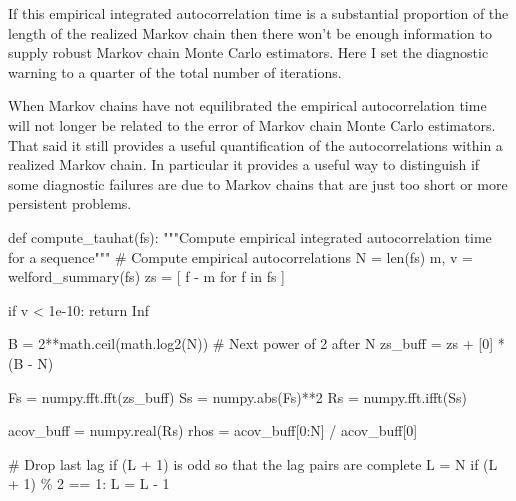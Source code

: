 \documentclass[
  letterpaper,
  DIV=11,
  numbers=noendperiod]{scrartcl}
\newenvironment{Shaded}{\begin{snugshade}}{\end{snugshade}}
\newcommand{\BuiltInTok}[1]{\textcolor[rgb]{0.00,0.23,0.31}{#1}}
\newcommand{\CommentTok}[1]{\textcolor[rgb]{0.37,0.37,0.37}{#1}}
\newcommand{\ControlFlowTok}[1]{\textcolor[rgb]{0.00,0.23,0.31}{#1}}
\newcommand{\DecValTok}[1]{\textcolor[rgb]{0.68,0.00,0.00}{#1}}
\newcommand{\FloatTok}[1]{\textcolor[rgb]{0.68,0.00,0.00}{#1}}
\newcommand{\KeywordTok}[1]{\textcolor[rgb]{0.00,0.23,0.31}{#1}}
\newcommand{\NormalTok}[1]{\textcolor[rgb]{0.00,0.23,0.31}{#1}}
\newcommand{\OperatorTok}[1]{\textcolor[rgb]{0.37,0.37,0.37}{#1}}
\begin{document}
If this empirical integrated autocorrelation time is a substantial
proportion of the length of the realized Markov chain then there won't
be enough information to supply robust Markov chain Monte Carlo
estimators. Here I set the diagnostic warning to a quarter of the total
number of iterations.

When Markov chains have not equilibrated the empirical autocorrelation
time will not longer be related to the error of Markov chain Monte Carlo
estimators. That said it still provides a useful quantification of the
autocorrelations within a realized Markov chain. In particular it
provides a useful way to distinguish if some diagnostic failures are due
to Markov chains that are just too short or more persistent problems.

\begin{Shaded}
\begin{Highlighting}[]
\KeywordTok{def}\NormalTok{ compute\_tauhat(fs):}
  \CommentTok{"""Compute empirical integrated autocorrelation time for a sequence"""}
  \CommentTok{\# Compute empirical autocorrelations}
\NormalTok{  N }\OperatorTok{=} \BuiltInTok{len}\NormalTok{(fs)}
\NormalTok{  m, v }\OperatorTok{=}\NormalTok{ welford\_summary(fs)}
\NormalTok{  zs }\OperatorTok{=}\NormalTok{ [ f }\OperatorTok{{-}}\NormalTok{ m }\ControlFlowTok{for}\NormalTok{ f }\KeywordTok{in}\NormalTok{ fs ]}
  
  \ControlFlowTok{if}\NormalTok{ v }\OperatorTok{\textless{}} \FloatTok{1e{-}10}\NormalTok{:}
    \ControlFlowTok{return}\NormalTok{ Inf}
  
\NormalTok{  B }\OperatorTok{=} \DecValTok{2}\OperatorTok{**}\NormalTok{math.ceil(math.log2(N)) }\CommentTok{\# Next power of 2 after N}
\NormalTok{  zs\_buff }\OperatorTok{=}\NormalTok{ zs }\OperatorTok{+}\NormalTok{ [}\DecValTok{0}\NormalTok{] }\OperatorTok{*}\NormalTok{ (B }\OperatorTok{{-}}\NormalTok{ N)}
  
\NormalTok{  Fs }\OperatorTok{=}\NormalTok{ numpy.fft.fft(zs\_buff)}
\NormalTok{  Ss }\OperatorTok{=}\NormalTok{ numpy.}\BuiltInTok{abs}\NormalTok{(Fs)}\OperatorTok{**}\DecValTok{2}
\NormalTok{  Rs }\OperatorTok{=}\NormalTok{ numpy.fft.ifft(Ss)}

\NormalTok{  acov\_buff }\OperatorTok{=}\NormalTok{ numpy.real(Rs)}
\NormalTok{  rhos }\OperatorTok{=}\NormalTok{ acov\_buff[}\DecValTok{0}\NormalTok{:N] }\OperatorTok{/}\NormalTok{ acov\_buff[}\DecValTok{0}\NormalTok{]}
  
  \CommentTok{\# Drop last lag if (L + 1) is odd so that the lag pairs are complete}
\NormalTok{  L }\OperatorTok{=}\NormalTok{ N}
  \ControlFlowTok{if}\NormalTok{ (L }\OperatorTok{+} \DecValTok{1}\NormalTok{) }\OperatorTok{\%} \DecValTok{2} \OperatorTok{==} \DecValTok{1}\NormalTok{:}
\NormalTok{    L }\OperatorTok{=}\NormalTok{ L }\OperatorTok{{-}} \DecValTok{1}
  

\end{Highlighting}
\end{Shaded}
\end{document}

